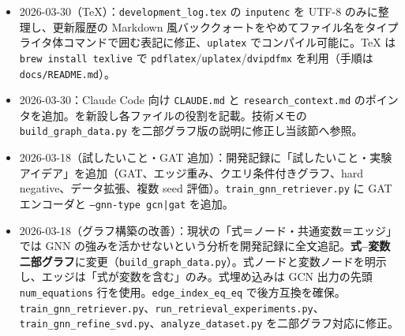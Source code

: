 \documentclass[11pt,a4paper]{jsarticle}
\begin{document}
\begin{itemize}[nosep]
\begin{itemize}[nosep]
      \item \textbf{ベースライン失敗分析}（\texttt{analyze\_baseline\_failures.py} 新規作成）：全1386ケースで \texttt{baseline\_mix} を評価し、失敗ケース（RR $<0.5$）の85件（6.1\%）を4パターンに分類。\textbf{cross\_domain}（100\%）と\textbf{context\_divergence}（78\%）が支配的 --- クエリと式の語彙が異なるケースでベースラインが失敗しており、意味理解（GNN/ニューラル）が有効な領域を特定。可視化を \texttt{figures/failure\_analysis\_summary.png} に出力。
      \item \textbf{複数seed評価の導入}（\texttt{run\_retrieval\_experiments.py} 改修）：5 seed（42, 123, 456, 789, 1024）で source\_id 分割を変え、平均$\pm$標準偏差と95\% bootstrap CIを報告する \texttt{--seeds N} モードを追加。結果：\texttt{baseline\_mix} の Test MRR $= 0.890 \pm 0.095$（95\% CI $[0.804, 0.949]$）。単一 seed（0.899）では見えなかった高分散を確認。
      \item \textbf{variant\_type 別評価の標準化}：original ケースの MRR $= 0.851 \pm 0.080$ に対し、random\_io\_from\_models の MRR $= 0.925 \pm 0.112$ と合成ケースが有意に簡単であることを定量的に確認。論文では original ケースの指標を主要報告とする方針。
    \end{itemize}
  \item 2026-03-30（TeX）：\texttt{development\_log.tex} の \texttt{inputenc} を UTF-8 のみに整理し、更新履歴の Markdown 風バッククォートをやめてファイル名をタイプライタ体コマンドで囲む表記に修正、\texttt{uplatex} でコンパイル可能に。TeX は \texttt{brew install texlive} で \texttt{pdflatex}/\texttt{uplatex}/\texttt{dvipdfmx} を利用（手順は \texttt{docs/README.md}）。
  \item 2026-03-30：Claude Code 向け \texttt{CLAUDE.md} と \texttt{research\_context.md} のポインタを追加。を新設し各ファイルの役割を記載。技術メモの \texttt{build\_graph\_data.py} を二部グラフ版の説明に修正し当該節へ参照。
  \item 2026-03-18（試したいこと・GAT 追加）：開発記録に「試したいこと・実験アイデア」を追加（GAT、エッジ重み、クエリ条件付きグラフ、hard negative、データ拡張、複数 seed 評価）。\texttt{train\_gnn\_retriever.py} に GAT エンコーダと \texttt{--gnn-type gcn|gat} を追加。
  \item 2026-03-18（グラフ構築の改善）：現状の「式＝ノード・共通変数＝エッジ」では GNN の強みを活かせないという分析を開発記録に全文追記。\textbf{式--変数二部グラフ}に変更（\texttt{build\_graph\_data.py}）。式ノードと変数ノードを明示し、エッジは「式が変数を含む」のみ。式埋め込みは GCN 出力の先頭 \texttt{num\_equations} 行を使用。\texttt{edge\_index\_eq\_eq} で後方互換を確保。\texttt{train\_gnn\_retriever.py}、\texttt{run\_retrieval\_experiments.py}、\texttt{train\_gnn\_refine\_svd.py}、\texttt{analyze\_dataset.py} を二部グラフ対応に修正。

\end{itemize}
\end{document}
